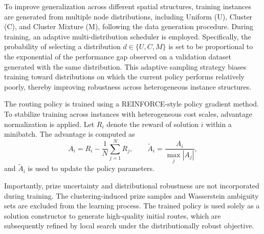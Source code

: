 \documentclass[preprint,12pt,authoryear]{elsarticle}
\theoremstyle{definition}
\begin{document}
To improve generalization across different spatial structures, training instances are generated from multiple node distributions, including Uniform (U), Cluster (C), and Cluster Mixture (M), following the data generation procedure. During training, an adaptive multi-distribution scheduler is employed. Specifically, the probability of selecting a distribution $d \in \{U, C, M\}$ is set to be proportional to the exponential of the performance gap observed on a validation dataset generated with the same distribution. This adaptive sampling strategy biases training toward distributions on which the current policy performs relatively poorly, thereby improving robustness across heterogeneous instance structures.

The routing policy is trained using a REINFORCE-style policy gradient method. To stabilize training across instances with heterogeneous cost scales, advantage normalization is applied. Let $R_i$ denote the reward of solution $i$ within a minibatch. The advantage is computed as
\[
A_i = R_i - \frac{1}{N}\sum_{j=1}^N R_j,
\qquad
\tilde{A}_i = \frac{A_i}{\max_j |A_j|},
\]
and $\tilde{A}_i$ is used to update the policy parameters.

Importantly, prize uncertainty and distributional robustness are not incorporated during training. The clustering-induced prize samples and Wasserstein ambiguity sets are excluded from the learning process. The trained policy is used solely as a solution constructor to generate high-quality initial routes, which are subsequently refined by local search under the distributionally robust objective.





 

\end{document}
